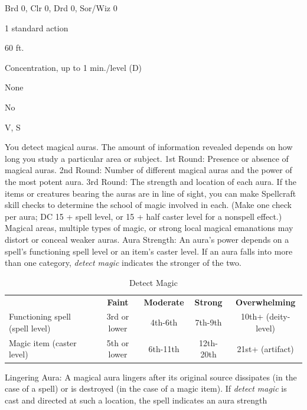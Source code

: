 
\begin{description*}
\item[Level:] Brd 0, Clr 0, Drd 0, Sor/Wiz 0
\item[Casting Time:] 1 standard action
\item[Range:] 60 ft.
\item[Duration:] Concentration, up to 1 min./level (D)
\item[Saving Throw:] None
\item[Spell Resistance:] No
\item[Components:] V, S
\end{description*}

You detect magical auras. The amount of information revealed depends on how long
you study a particular area or subject.
1st Round: Presence or absence of magical auras.
2nd Round: Number of different magical auras and the power of the most
potent aura.
3rd Round: The strength and location of each aura. If the items or creatures
bearing the auras are in line of sight, you can make Spellcraft skill checks to
determine the school of magic involved in each. (Make one check per aura; DC 15
+ spell level, or 15 + half caster level for a nonspell effect.)
Magical areas, multiple types of magic, or strong local magical emanations may
distort or conceal weaker auras.
Aura Strength: An aura's power depends on a spell's functioning spell
level or an item's caster level. If an aura falls into more than one category,
\textit{detect magic} indicates the stronger of the two.
\begin{table}[htb]
\caption{Detect Magic}
\centering
\begin{tabular}{l c c c c}
& \textbf{Faint} & \textbf{Moderate} & \textbf{Strong} & \textbf{Overwhelming}\\
Functioning spell (spell level) & 3rd or lower & 4th-6th & 7th-9th & 10th+ (deity-level)\\
Magic item (caster level) & 5th or lower & 6th-11th & 12th-20th & 21st+ (artifact)\\
\end{tabular}
\end{table}
Lingering Aura: A magical aura lingers after its original source dissipates
(in the case of a spell) or is destroyed (in the case of a magic item). If \textit{detect
magic} is cast and directed at such a location, the spell indicates an aura strength
